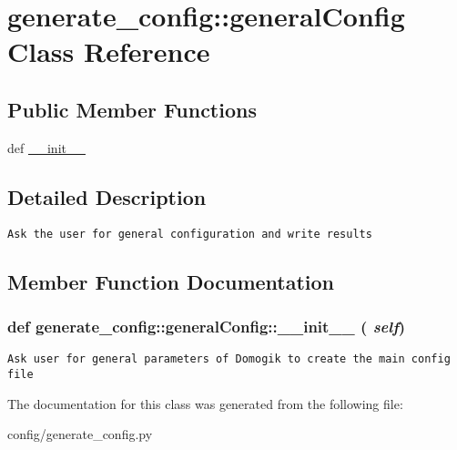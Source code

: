 \hypertarget{classgenerate__config_1_1generalConfig}{
\section{generate\_\-config::generalConfig Class Reference}
\label{classgenerate__config_1_1generalConfig}
}
\subsection*{Public Member Functions}
\begin{CompactItemize}
\item 
def \hyperlink{classgenerate__config_1_1generalConfig_470de1124f102c64ad61af244dbac061}{\_\-\_\-init\_\-\_\-}
\end{CompactItemize}


\subsection{Detailed Description}


\footnotesize\begin{verbatim}
Ask the user for general configuration and write results
\end{verbatim}
\normalsize
 

\subsection{Member Function Documentation}
\hypertarget{classgenerate__config_1_1generalConfig_470de1124f102c64ad61af244dbac061}{
\subsubsection[\_\-\_\-init\_\-\_\-]{\setlength{\rightskip}{0pt plus 5cm}def generate\_\-config::generalConfig::\_\-\_\-init\_\-\_\- ( {\em self})}}
\label{classgenerate__config_1_1generalConfig_470de1124f102c64ad61af244dbac061}




\footnotesize\begin{verbatim}
Ask user for general parameters of Domogik to create the main config file
\end{verbatim}
\normalsize
 

The documentation for this class was generated from the following file:\begin{CompactItemize}
\item 
config/generate\_\-config.py\end{CompactItemize}
